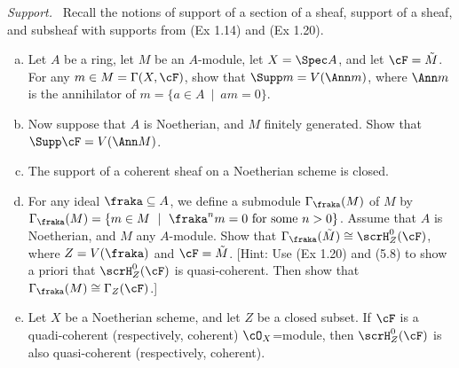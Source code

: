 \newpage
{}
\begin{homework}[e]
	 \emph{Support.}~ Recall the notions of support of a section of a sheaf, support of a sheaf, and subsheaf with supports from (Ex 1.14) and (Ex 1.20).
	\begin{enumerate}[(a)]
		\item Let $A$ be a ring, let $M$ be an $A$-module, let $X = \Spec A$, and let $\cF = \tilde{M}$. For any $m \in M = \Gamma(X,\cF)$, show that $\Supp m = V(\Ann m)$, where $\Ann m$ is the annihilator of $m = \{ a \in A ~\mid~ am = 0\}$.
		\item Now suppose that $A$ is Noetherian, and $M$ finitely generated. Show that $\Supp \cF = V(\Ann M)$.
		\item The support of a coherent sheaf on a Noetherian scheme is closed.
		\item For any ideal $\fraka \subseteq A$, we define a submodule $\Gamma_\fraka(M)$ of $M$ by $\Gamma_\fraka(M) = \{m \in M~\mid~\fraka^nm = 0 \text{ for some } n >0\}$. Assume that $A$ is Noetherian, and $M$ any $A$-module. Show that $\Gamma_\fraka(\tilde{M}) \cong \scrH^0_Z(\cF)$, where $Z = V(\fraka)$ and $\cF = \tilde{M}$. [Hint: Use (Ex 1.20) and (5.8) to show a priori that $\scrH^0_Z(\cF)$ is quasi-coherent. Then show that $\Gamma_\fraka(M) \cong \Gamma_Z(\cF)$.]
		\item Let $X$ be a Noetherian scheme, and let $Z$ be a closed subset. If $\cF$ is a quadi-coherent (respectively, coherent) $\cO_X$=module, then $\scrH^0_Z(\cF)$ is also quasi-coherent (respectively, coherent).
	\end{enumerate}
\end{homework}
\newpage
{}

